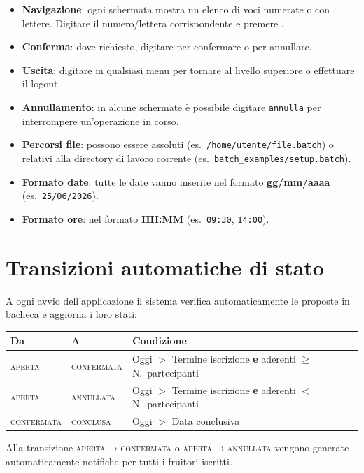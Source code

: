 \documentclass[12pt,a4paper,oneside]{report}
\newcommand{\cmd}[1]{\texttt{\small#1}}
\newcommand{\file}[1]{\texttt{\small#1}}
\newcommand{\tasto}[1]{\fbox{\small\ttfamily#1}}
\begin{document}
\begin{itemize}
  \item \textbf{Navigazione}: ogni schermata mostra un elenco di voci numerate o con lettere. Digitare il numero/lettera corrispondente e premere \tasto{INVIO}.
  \item \textbf{Conferma}: dove richiesto, digitare \tasto{s} per confermare o \tasto{n} per annullare.
  \item \textbf{Uscita}: digitare \tasto{0} in qualsiasi menu per tornare al livello superiore o effettuare il logout.
  \item \textbf{Annullamento}: in alcune schermate è possibile digitare \cmd{annulla} per interrompere un'operazione in corso.
  \item \textbf{Percorsi file}: possono essere assoluti (es.\ \file{/home/utente/file.batch}) o relativi alla directory di lavoro corrente (es.\ \file{batch\_examples/setup.batch}).
  \item \textbf{Formato date}: tutte le date vanno inserite nel formato \textbf{gg/mm/aaaa} (es.\ \cmd{25/06/2026}).
  \item \textbf{Formato ore}: nel formato \textbf{HH:MM} (es.\ \cmd{09:30}, \cmd{14:00}).
\end{itemize}

\section{Transizioni automatiche di stato}

A ogni avvio dell'applicazione il sistema verifica automaticamente le proposte in bacheca e aggiorna i loro stati:

\begin{center}
\begin{tabular}{L{3.5cm}L{3.5cm}L{6cm}}
\toprule
\textbf{Da} & \textbf{A} & \textbf{Condizione} \\
\midrule
\textsc{aperta} & \textsc{confermata} & Oggi $>$ Termine iscrizione \textbf{e} aderenti $\geq$ N.\ partecipanti \\
\textsc{aperta} & \textsc{annullata}  & Oggi $>$ Termine iscrizione \textbf{e} aderenti $<$ N.\ partecipanti \\
\textsc{confermata} & \textsc{conclusa} & Oggi $>$ Data conclusiva \\
\bottomrule
\end{tabular}
\end{center}

Alla transizione \textsc{aperta}$\to$\textsc{confermata} o \textsc{aperta}$\to$\textsc{annullata} vengono generate automaticamente notifiche per tutti i fruitori iscritti.
\end{document}
